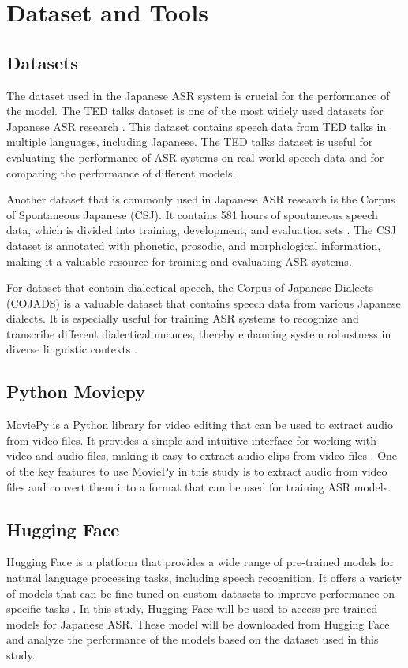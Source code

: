 \section{ Dataset and Tools }
\subsection{Datasets}
The dataset used in the Japanese ASR system is crucial for the performance of the model. The TED talks dataset is one of the most widely used datasets for Japanese ASR research \parencite{Afouras}. This dataset contains speech data from TED talks in multiple languages, including Japanese. The TED talks dataset is useful for evaluating the performance of ASR systems on real-world speech data and for comparing the performance of different models.

Another dataset that is commonly used in Japanese ASR research is the Corpus of Spontaneous Japanese (CSJ). It contains 581 hours of spontaneous speech data, which is divided into training, development, and evaluation sets \parencite{Andos}. The CSJ dataset is annotated with phonetic, prosodic, and morphological information, making it a valuable resource for training and evaluating ASR systems. 

For dataset that contain dialectical speech, the Corpus of Japanese Dialects (COJADS) is a valuable dataset that contains speech data from various Japanese dialects. It is especially useful for training ASR systems to recognize and transcribe different dialectical nuances, thereby enhancing system robustness in diverse linguistic contexts \parencite{kibe2018intonational}.

\subsection{Python Moviepy}
MoviePy is a Python library for video editing that can be used to extract audio from video files. It provides a simple and intuitive interface for working with video and audio files, making it easy to extract audio clips from video files \parencite{boishakhi2021multi}. One of the key features to use MoviePy in this study is to extract audio from video files and convert them into a format that can be used for training ASR models.

\subsection{Hugging Face}
Hugging Face is a platform that provides a wide range of pre-trained models for natural language processing tasks, including speech recognition. It offers a variety of models that can be fine-tuned on custom datasets to improve performance on specific tasks \parencite{boishakhi2021multi}. In this study, Hugging Face will be used to access pre-trained models for Japanese ASR. These model will be downloaded from Hugging Face and analyze the performance of the models based on the dataset used in this study.

